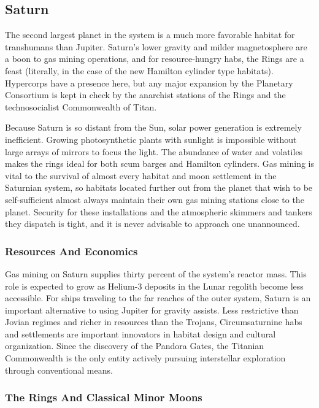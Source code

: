 \subsection{Saturn}

The second largest planet in the system is a much 
more favorable habitat for transhumans than Jupiter. 
Saturn's lower gravity and milder magnetosphere are 
a boon to gas mining operations, and for resource-hungry habs, the Rings are a feast (literally, in the case 
of the new Hamilton cylinder type habitats). Hypercorps have a presence here, but any major expansion 
by the Planetary Consortium is kept in check by the 
anarchist stations of the Rings and the technosocialist 
Commonwealth of Titan.

Because Saturn is so distant from the Sun, solar 
power generation is extremely inefficient. Growing 
photosynthetic plants with sunlight is impossible 
without large arrays of mirrors to focus the light. The 
abundance of water and volatiles makes the rings 
ideal for both scum barges and Hamilton cylinders. 
Gas mining is vital to the survival of almost every 
habitat and moon settlement in the Saturnian system, 
so habitats located further out from the planet that 
wish to be self-sufficient almost always maintain their 
own gas mining stations close to the planet. Security 
for these installations and the atmospheric skimmers 
and tankers they dispatch is tight, and it is never advisable to approach one unannounced.

\subsubsection{Resources And Economics}

Gas mining on Saturn supplies thirty percent of the 
system's reactor mass. This role is expected to grow 
as Helium-3 deposits in the Lunar regolith become 
less accessible. For ships traveling to the far reaches 
of the outer system, Saturn is an important alternative to using Jupiter for gravity assists. Less restrictive than Jovian regimes and richer in resources than 
the Trojans, Circumsaturnine habs and settlements 
are important innovators in habitat design and cultural organization. Since the discovery of the Pandora 
Gates, the Titanian Commonwealth is the only entity 
actively pursuing interstellar exploration through 
conventional means.

\subsubsection{The Rings And Classical Minor Moons}

